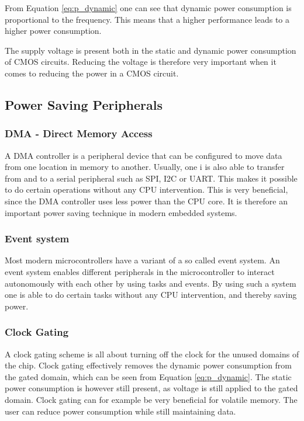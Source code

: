 From Equation \ref{eq:p_dynamic} one can see that dynamic power consumption is proportional to the frequency. This means that a higher performance leads to a higher power consumption.

The supply voltage is present both in the static and dynamic power consumption of CMOS circuits. Reducing the voltage is therefore very important when it comes to reducing the power in a CMOS circuit.

\subsection{Power Saving Peripherals}

\subsubsection{DMA - Direct Memory Access}

A DMA controller is a peripheral device that can be configured to move data from one location in memory to another. Usually, one i is also able to transfer from and to a serial peripheral such as SPI, I2C or UART. This makes it possible to do certain operations without any CPU intervention. This is very beneficial, since the DMA controller uses less power than the CPU core. It is therefore an important power saving technique in modern embedded systems.  

\subsubsection{Event system}

Most modern microcontrollers have a variant of a so called event system. An event system enables different peripherals in the microcontroller to interact autonomously with each other by using tasks and events. By using such a system one is able to do certain tasks without any CPU intervention, and thereby saving power.

\subsubsection{Clock Gating}

A clock gating scheme is all about turning off the clock for the unused domains of the chip. Clock gating effectively removes the dynamic power consumption from the gated domain, which can be seen from Equation \ref{eq:p_dynamic}. The static power consumption is however still present, as voltage is still applied to the gated domain. Clock gating can for example be very beneficial for volatile memory. The user can reduce power consumption while still maintaining data.

